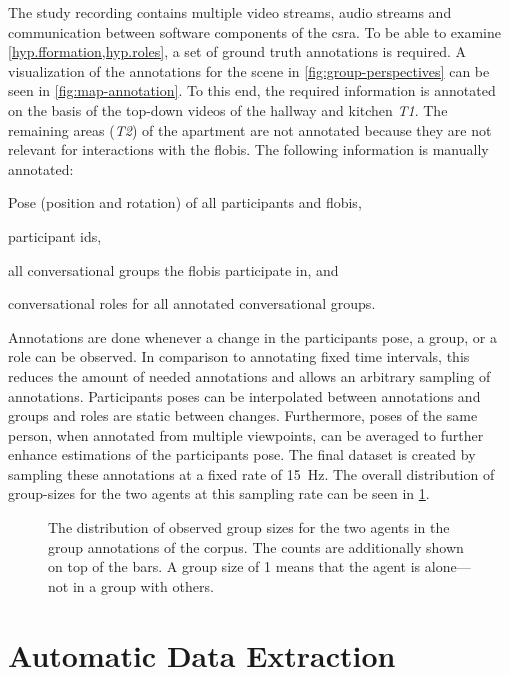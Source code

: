 The study recording contains multiple video streams, audio streams and communication between software components of the \gls{csra}.
To be able to examine \cref{hyp.fformation,hyp.roles}, a set of ground truth annotations is required. 
A visualization of the annotations for the scene in \cref{fig:group-perspectives} can be seen in \cref{fig:map-annotation}.
To this end, the required information is annotated on the basis of the top-down videos of the hallway and kitchen \emph{T1}.
The remaining areas (\emph{T2}) of the \gls{apartment} are not annotated because they are not relevant for interactions with the \glspl{flobi}.
The following information is manually annotated:
\begin{enumerate*}[label=(\arabic*)]
    \item Pose (position and rotation) of all participants and \glspl{flobi},
    \item participant ids,
    \item all \glspl{conversational group} the \glspl{flobi} participate in, and
    \item \glspl{conversational role} for all annotated \glspl{conversational group}.
\end{enumerate*}
Annotations are done whenever a change in the participants pose, a group, or a role can be observed.
In comparison to annotating fixed time intervals, this reduces the amount of needed annotations and allows an arbitrary sampling of annotations.
Participants poses can be interpolated between annotations and groups and roles are static between changes.
Furthermore, poses of the same person, when annotated from multiple viewpoints, can be averaged to further enhance estimations of the participants pose.
The final dataset is created by sampling these annotations at a fixed rate of \SI{15}{\Hz}.
The overall distribution of group-sizes for the two agents at this sampling rate can be seen in \cref{fig:group-sizes}.
\begin{figure}[htb]
  \centering
    \small
    
    \caption[Distribution of group sizes of agents.]{\label{fig:group-sizes}
    The distribution of observed group sizes for the two agents in the group annotations of the corpus.
    The counts are additionally shown on top of the bars.
    A group size of 1 means that the agent is alone---not in a group with others.
    }
\end{figure}

\section{Automatic Data Extraction}\label{sec.group.extraction}

